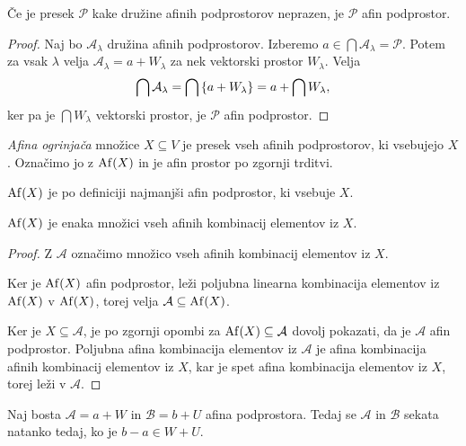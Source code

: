 \begin{trditev}
    Če je presek $\mathcal{P}$ kake družine afinih podprostorov neprazen, je $\mathcal{P}$ afin podprostor.
\end{trditev}

\begin{proof}
    Naj bo $\mathcal{A}_{\lambda}$ družina afinih podprostorov. Izberemo $a \in \bigcap \mathcal{A}_{\lambda} = \mathcal{P}$. Potem za vsak $\lambda$ velja $\mathcal{A}_{\lambda} = a + W_{\lambda}$ za nek vektorski prostor $W_{\lambda}$. Velja
    \[
    \bigcap \mathcal{A}_{\lambda} = \bigcap \left\{a + W_{\lambda}\right\} = a + \bigcap W_{\lambda},
    \]
    ker pa je $\bigcap W_{\lambda}$ vektorski prostor, je $\mathcal{P}$ afin podprostor.
\end{proof}

\begin{definicija}
    \emph{Afina ogrinjača} množice $X \subseteq V$ je presek vseh afinih podprostorov, ki vsebujejo $X$. Označimo jo z $\operatorname{Af} (X)$ in je afin prostor po zgornji trditvi.
\end{definicija}

\begin{opomba}
    $\operatorname{Af} (X)$ je po definiciji najmanjši afin podprostor, ki vsebuje $X$.
\end{opomba}

\begin{trditev}
    $\operatorname{Af} (X)$ je enaka množici vseh afinih kombinacij elementov iz $X$.
\end{trditev}

\begin{proof}
    Z $\mathcal{A}$ označimo množico vseh afinih kombinacij elementov iz $X$.

    Ker je $\operatorname{Af} (X)$ afin podprostor, leži poljubna linearna kombinacija elementov iz $\operatorname{Af} (X)$ v $\operatorname{Af} (X)$, torej velja $\mathcal{A} \subseteq \operatorname{Af} (X)$.

    Ker je $X \subseteq \mathcal{A}$, je po zgornji opombi za $\operatorname{Af} (X) \subseteq \mathcal{A}$ dovolj pokazati, da je $\mathcal{A}$ afin podprostor. Poljubna afina kombinacija elementov iz $\mathcal{A}$ je afina kombinacija afinih kombinacij elementov iz $X$,
    kar je spet afina kombinacija elementov iz $X$, torej leži v $\mathcal{A}$.
\end{proof}

\begin{lema}
    Naj bosta $\mathcal{A} = a + W$ in $\mathcal{B} = b + U$ afina podprostora. Tedaj se $\mathcal{A}$ in $\mathcal{B}$ sekata natanko tedaj, ko je $b - a \in W + U$.
\end{lema}

